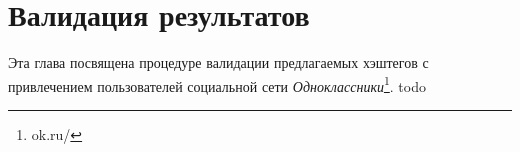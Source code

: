 \section{Валидация результатов}

\indent
\indent
Эта глава посвящена процедуре валидации предлагаемых 
хэштегов с привлечением пользователей социальной сети 
\textit{Одноклассники}\footnote{ok.ru/}.
todo